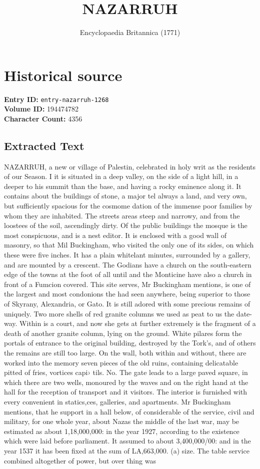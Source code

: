\documentclass{article}
\title{NAZARRUH}
\date{Encyclopaedia Britannica (1771)}
\begin{document}
\maketitle

\section*{Historical source}
\textbf{Entry ID:} \texttt{entry-nazarruh-1268} \\
\textbf{Volume ID:} 194474782 \\
\textbf{Character Count:} 4356

\subsection*{Extracted Text}
NAZARRUH, a new or village of Palestin, celebrated in holy writ as the residents of our Season. I it is situated in a deep valley, on the side of a light hill, in a deeper to his summit than the base, and having a rocky eminence along it. It contains about the buildings of stone, a major tel always a land, and very own, but sufficiently spacious for the cosmome dation of the immense poor families by whom they are inhabited. The streets areas steep and narrowy, and from the loostees of the soil, ascendingly dirty. Of the public buildings the mosque is the most conspicuous, and is a nest editor. It is enclosed with a good wall of masonry, so that Mil Buckingham, who visited the only one of its sides, on which these were five inches. It has a plain whitelant minutes, surrounded by a gallery, and are mounted by a crescent. The Godians have a church on the south-eastern edge of the towns at the foot of all until and the Monticine have also a church in front of a Fumcion covered. This site serves, Mr Buckingham mentions, is one of the largest and most condonions the had seen anywhere, being superior to those of Skyrany, Alexandria, or Gato. It is still adored with some precious remains of uniquely. Two more shells of red granite columns we used as peat to us the date-way. Within is a court, and now she gets at further extremely is the fragment of a death of another granite column, lying on the ground. White pilares form the portals of entrance to the original building, destroyed by the Tork's, and of others the remains are still too large. On the wall, both within and without, there are worked into the memory seven pieces of the old ruins, containing delicatable pitted of fries, vortices capi› tils. No. The gate leads to a large paved square, in which there are two wells, monoured by the waves and on the right hand at the hall for the reception of transport and it visitors. The interior is furnished with every convenient in statics,ces, galleries, and apartments. Mr Buckingham mentions, that he support in a hall below, of considerable of the service, civil and military, for one whole year, about Nazas the middle of the last war, may be estimated as about 1,18,000,000: in the year 1927, according to the existence which were laid before parliament. It assumed to about 3,400,000/00: and in the year 1537 it has been fixed at the sum of LA,663,000. (a) size. The table service combined altogether of power, but over thing was 
\end{document}

